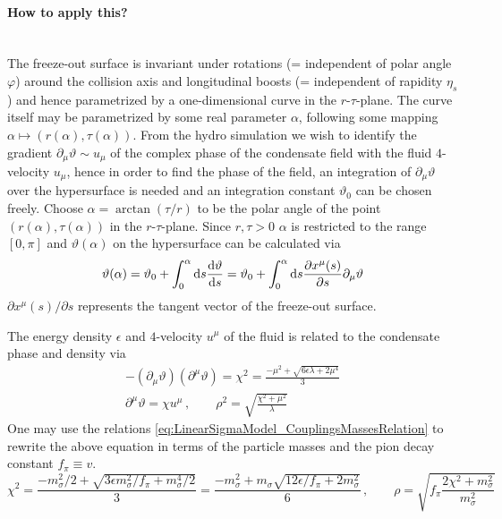 % 

\paragraph*{How to apply this?}\mbox{}\\

The freeze-out surface is invariant under rotations (= independent of polar angle $\varphi$) around the collision axis and longitudinal boosts (= independent of rapidity $\eta_s$) and hence parametrized by a one-dimensional curve in the $r\text{-}\tau$-plane. The curve itself may be parametrized by some real parameter $\alpha$, following some mapping $\alpha\mapsto (r(\alpha),\tau(\alpha))$. From the hydro simulation we wish to identify the gradient $\partial_\mu\vartheta\sim u_\mu$ of the complex phase of the condensate field with the fluid $4$-velocity $u_\mu$, hence in order to find the phase of the field, an integration of $\partial_\mu\vartheta$ over the hypersurface is needed and an integration constant $\vartheta_0$ can be chosen freely. Choose $\alpha=\arctan(\tau/r)$ to be the polar angle of the point $(r(\alpha),\tau(\alpha))$ in the $r\text{-}\tau$-plane. Since $r,\tau>0$ $\alpha$ is restricted to the range $[0,\pi]$ and $\vartheta(\alpha)$ on the hypersurface can be calculated via
\begin{equation}
    \vartheta(\alpha)=\vartheta_0+\int_0^\alpha\text{d} s\frac{\text{d}\vartheta}{\text{d} s}=\vartheta_0+\int_0^\alpha\text{d} s\frac{\partial x^\mu(s)}{\partial s}\partial_\mu\vartheta
\end{equation}
$\partial x^\mu(s)/\partial s$ represents the tangent vector of the freeze-out surface.

The energy density $\epsilon$ and $4$-velocity $u^\mu$ of the fluid is related to the condensate phase and density via
\begin{subequations}
    \begin{gather}
        -(\partial_\mu\vartheta)(\partial^\mu\vartheta)=\chi^2=\frac{-\mu^2+\sqrt{6\epsilon\lambda+2\mu^4}}{3}\\
        \partial^\mu\vartheta=\chi u^\mu\,,\qquad\rho^2=\sqrt{\frac{\chi^2+\mu^2}{\lambda}}
    \end{gather}
\end{subequations}
One may use the relations \eqref{eq:LinearSigmaModel_CouplingsMassesRelation} to rewrite the above equation in terms of the particle masses and the pion decay constant $f_\pi\equiv v$.
\begin{equation}
    \chi^2=\frac{-m_\sigma^2/2+\sqrt{3\epsilon m_\sigma^2/f_\pi+m_\sigma^4/2}}{3}=\frac{-m_\sigma^2+m_\sigma\sqrt{12\epsilon/f_\pi+2m_\sigma^2}}{6}\,,\qquad\rho=\sqrt{f_\pi\frac{2\chi^2+m_\sigma^2}{m_\sigma^2}}
\end{equation}

